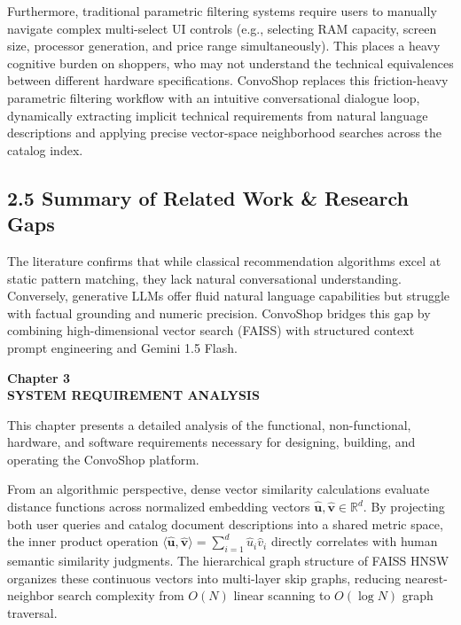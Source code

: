 \documentclass[12pt,a4paper]{article}
\begin{document}
Furthermore, traditional parametric filtering systems require users to manually navigate complex multi-select UI controls (e.g., selecting RAM capacity, screen size, processor generation, and price range simultaneously). This places a heavy cognitive burden on shoppers, who may not understand the technical equivalences between different hardware specifications. ConvoShop replaces this friction-heavy parametric filtering workflow with an intuitive conversational dialogue loop, dynamically extracting implicit technical requirements from natural language descriptions and applying precise vector-space neighborhood searches across the catalog index.

\subsection*{2.5 Summary of Related Work \& Research Gaps}
\label{sec:2.5}
The literature confirms that while classical recommendation algorithms excel at static pattern matching, they lack natural conversational understanding. Conversely, generative LLMs offer fluid natural language capabilities but struggle with factual grounding and numeric precision. ConvoShop bridges this gap by combining high-dimensional vector search (FAISS) with structured context prompt engineering and Gemini 1.5 Flash.

\newpage

\label{chap:3}
\begin{center}
{\fontsize{14}{17}\bfseries Chapter 3\\[6pt]}
{\fontsize{16}{20}\bfseries SYSTEM REQUIREMENT ANALYSIS\\[10pt]}
\end{center}

This chapter presents a detailed analysis of the functional, non-functional, hardware, and software requirements necessary for designing, building, and operating the ConvoShop platform.



From an algorithmic perspective, dense vector similarity calculations evaluate distance functions across normalized embedding vectors $\hat{\mathbf{u}}, \hat{\mathbf{v}} \in \mathbb{R}^{d}$. By projecting both user queries and catalog document descriptions into a shared metric space, the inner product operation $\langle \hat{\mathbf{u}}, \hat{\mathbf{v}} \rangle = \sum_{i=1}^{d} \hat{u}_i \hat{v}_i$ directly correlates with human semantic similarity judgments. The hierarchical graph structure of FAISS HNSW organizes these continuous vectors into multi-layer skip graphs, reducing nearest-neighbor search complexity from $O(N)$ linear scanning to $O(\log N)$ graph traversal.
\end{document}
